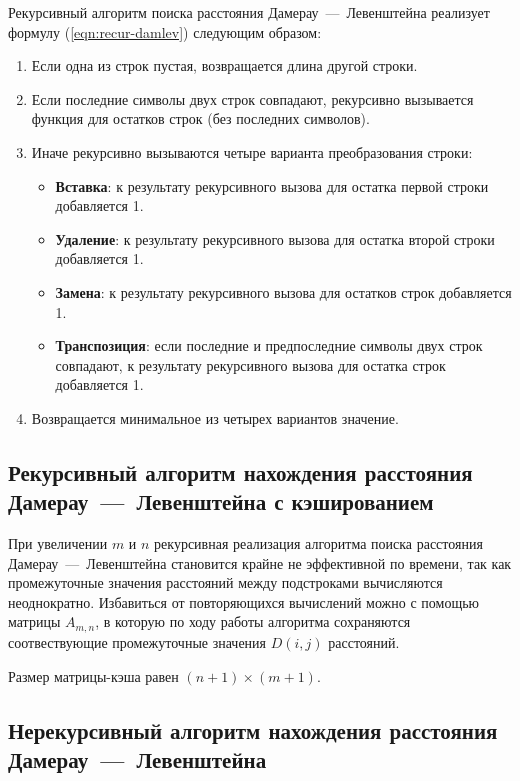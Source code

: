 Рекурсивный алгоритм поиска расстояния Дамерау~---~Левенштейна реализует формулу (\ref{eqn:recur-damlev}) следующим образом:
\begin{enumerate}
    \item Если одна из строк пустая, возвращается длина другой строки.
    \item Если последние символы двух строк совпадают, рекурсивно вызывается функция для остатков строк (без последних символов).
    \item Иначе рекурсивно вызываются четыре варианта преобразования строки:
    \begin{itemize}
        \item \textbf{Вставка}: к результату рекурсивного вызова для остатка первой строки добавляется 1.
        \item \textbf{Удаление}: к результату рекурсивного вызова для остатка второй строки добавляется 1.
        \item \textbf{Замена}: к результату рекурсивного вызова для остатков строк добавляется 1.
        \item \textbf{Транспозиция}: если последние и предпоследние символы двух строк совпадают, к результату рекурсивного вызова для остатка строк добавляется 1.
    \end{itemize}
    \item Возвращается минимальное из четырех вариантов значение.
\end{enumerate}


\subsection{\texorpdfstring{Рекурсивный алгоритм нахождения расстояния Дамерау~---~Левенштейна с кэшированием}{}}

При увеличении $m$ и $n$ рекурсивная реализация алгоритма поиска расстояния Дамерау~---~Левенштейна становится крайне не эффективной по времени, так как промежуточные значения расстояний между подстроками вычисляются неоднократно.
Избавиться от повторяющихся вычислений можно с помощью матрицы $A_{m, n}$, в которую по ходу работы алгоритма сохраняются соотвествующие промежуточные значения $D(i, j)$ расстояний.

Размер матрицы-кэша равен $(n + 1) \times (m + 1)$.

\subsection{\texorpdfstring{Нерекурсивный алгоритм нахождения расстояния Дамерау~---~Левенштейна}{}}

